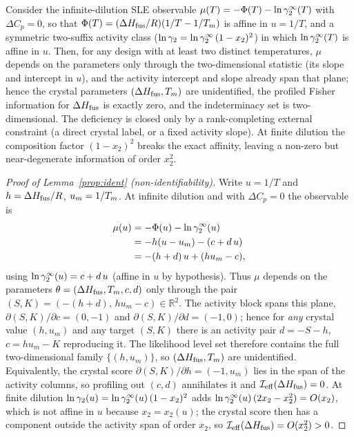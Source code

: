 \begin{lemma}\label{prop:ident}
Consider the infinite-dilution SLE observable $\mu(T)=-\Phi(T)-\ln\gamma_2^\infty(T)$ with
$\Delta C_p=0$, so that $\Phi(T)=(\Delta H_{\mathrm{fus}}/R)(1/T-1/T_m)$ is affine in $u=1/T$,
and a symmetric two-suffix activity class ($\ln\gamma_2=\ln\gamma_2^\infty\,(1-x_2)^2$) in which
$\ln\gamma_2^\infty(T)$ is affine in $u$. Then, for any design with at least two distinct
temperatures, $\mu$ depends on the parameters only through the two-dimensional
statistic (its slope and intercept in $u$), and the activity intercept and slope
already span that plane; hence the crystal parameters $(\Delta H_{\mathrm{fus}},T_m)$ are unidentified, the profiled
Fisher information for $\Delta H_{\mathrm{fus}}$ is exactly zero, and the indeterminacy set is
two-dimensional. The deficiency is closed only by a rank-completing external
constraint (a direct crystal label, or a fixed activity slope). At finite dilution
the composition factor $(1-x_2)^2$ breaks the exact affinity, leaving a non-zero but
near-degenerate information of order $x_2^2$.
\end{lemma}
\begin{proof}[Proof of Lemma~\ref{prop:ident} (non-identifiability)]
Write $u=1/T$ and $h=\Delta H_{\mathrm{fus}}/R$, $u_m=1/T_m$. At infinite dilution and with
$\Delta C_p=0$ the observable is
\[
\begin{aligned}
  \mu(u)&=-\Phi(u)-\ln\gamma_2^\infty(u)\\
  &=-h(u-u_m)-(c+d\,u)\\
  &=-(h+d)\,u+(h u_m-c),
\end{aligned}
\]
using $\ln\gamma_2^\infty(u)=c+d\,u$ (affine in $u$ by hypothesis). Thus $\mu$ depends on the
parameters $\theta=(\Delta H_{\mathrm{fus}},T_m,c,d)$ only through the pair
$(S,K)=(-(h+d),\,h u_m-c)\in\mathbb R^2$. The activity block spans this plane,
$\partial(S,K)/\partial c=(0,-1)$ and $\partial(S,K)/\partial d=(-1,0)$; hence for
\emph{any} crystal value $(h,u_m)$ and any target $(S,K)$ there is an activity pair
$d=-S-h$, $c=h u_m-K$ reproducing it. The likelihood level set therefore contains the
full two-dimensional family $\{(h,u_m)\}$, so $(\Delta H_{\mathrm{fus}},T_m)$ are unidentified.
Equivalently, the crystal score $\partial(S,K)/\partial h=(-1,u_m)$ lies in the span
of the activity columns, so profiling out $(c,d)$ annihilates it and
$\mathcal I_{\mathrm{eff}}(\Delta H_{\mathrm{fus}})=0$. At finite dilution
$\ln\gamma_2(u)=\ln\gamma_2^\infty(u)\,(1-x_2)^2$ adds $\ln\gamma_2^\infty(u)\,(2x_2-x_2^2)=O(x_2)$, which is not
affine in $u$ because $x_2=x_2(u)$; the crystal score then has a component outside the
activity span of order $x_2$, so $\mathcal I_{\mathrm{eff}}(\Delta H_{\mathrm{fus}})=O(x_2^2)>0$.
\end{proof}

